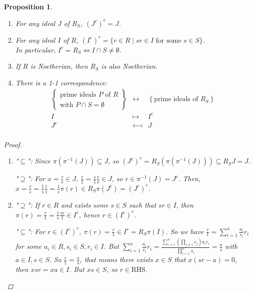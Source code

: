 \documentclass[a4paper]{article}
\theoremstyle{mystyle}
\newtheorem{prop}{Proposition}
\begin{document}
\begin{prop} \mbox{}
  \begin{enumerate}
    \item For any ideal $J$ of $R_S$, $(J^c)^e = J$.
    \item For any ideal $I$ of $R$, $(I^e)^c = \{r \in R \mid sr \in I \textrm{ for some } s \in S\}$. \\
      In particular, $I^e = R_S \iff I \cap S \neq \emptyset$.
    \item If $R$ is Noetherian, then $R_S$ is also Noetherian.
    \item There is a 1-1 correspondence:
      \[
        \begin{array}{ccc}
          \left\{ \begin{array}{c} \textrm{prime ideals $P$ of $R$} \\ 
          \textrm{with }P \cap S = \emptyset \end{array} \right\} 
          &\longleftrightarrow& \left\{\textrm{prime ideals of $R_S$} \right\} \\
          I &\longmapsto& I^e \\
          J^c &\longmapsfrom& J \\
      \end{array}
      \]
  \end{enumerate}

  \begin{proof}
    $\ $
    \begin{enumerate}
      \item 
        "$\subseteq$":
        Since $\pi(\pi^{-1}(J)) \subseteq J$, so 
        $(J^c)^e = R_S(\pi(\pi^{-1}(J))) \subseteq R_S J = J$.

        "$\supseteq$":
        For $x = \frac{r}{s} \in J$, $\frac{r}{1} = \frac{s}{1}\frac{r}{s} \in J$, so $r \in \pi^{-1}(J) = J^c$.
        Then, $x = \frac{r}{s} = \frac{1}{s}\frac{r}{1} = \frac{1}{s} \pi(r) \in R_S \pi(J^c) = (J^c)^e$.

      \item 
        "$\supseteq$":
        If $r \in R$ and exists some $s \in S$ such that $sr \in I$, then 
        $\pi(r) = \frac{r}{1} = \frac{1}{s}\frac{sr}{1} \in I^e$, hence $r \in (I^e)^c$.

        "$\subseteq$":
        For $r \in (I^e)^c$, $\pi(r) = \frac{r}{1} \in I^e = R_S \pi(I)$. So we have
        $\frac{r}{1} = \sum_{i=1}^n \frac{a_i}{s_i}r_i$ for some $a_i \in R, s_i \in S, r_i \in I$.
        But $\sum_{i=1}^n \frac{a_i}{s_i}r_i = 
        \frac{\sum\limits_{i=1}^n \left(\prod_{j\neq i} s_j \right) a_ir_i}{\prod_{i=1}^n s_i}
        = \frac{a}{s}$ with $a \in I, s \in S$.
        So $\frac{r}{1} = \frac{a}{s}$, that means there exists $x \in S$ that $x(sr-a) = 0$, 
        then $xsr = xa \in I$. But $xs \in S$, so $r \in \textrm{RHS}$.


\end{enumerate}
\end{proof}
\end{prop}
\end{document}
